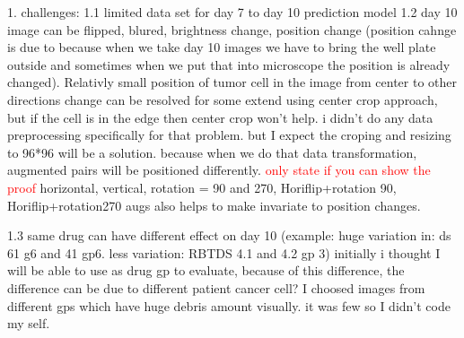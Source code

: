 1. challenges:
1.1 limited data set for day 7 to day 10 prediction model
1.2 day 10  image can be flipped, blured, brightness change, position change (position cahnge is due to because when we take day 10 images we have to bring the
 well plate outside and sometimes
 when we put that into microscope the position is already changed). Relativly small position of tumor cell in the image from center to other directions change  can 
be resolved for some extend using center crop approach, but if the cell is in the edge then center crop won't help. i didn't do any data
 preprocessing
 specifically for that problem. but I expect the croping and resizing to 96*96 will be a solution. because 
 when we do that 
 data transformation, augmented pairs will be positioned differently.  \textcolor{red}{only state if you can show the proof} 
 horizontal, vertical, rotation = 90 and 270, Horiflip+rotation 90,
  Horiflip+rotation270 
 augs also helps to make invariate to position changes.
 

1.3 same drug can have different effect on day 10 (example: huge variation in: ds 61 g6 and 41 gp6. less variation: 
RBTDS 4.1 and 4.2 gp 3) initially i thought I will be able to use 
as drug gp to evaluate, because of this difference, the difference can be due to different patient cancer cell?
I choosed images from different gps which have huge debris amount visually. it was few so I didn't code my self.
